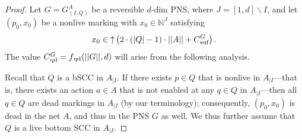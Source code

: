 \documentclass[11pt,a4paper]{amsart}
\newcommand{\nnorm}[1]{||#1||}
\newcommand{\upC}[1]{\mathop{\uparrow}#1}
\newcommand{\suf}{{}_\textnormal{suf}}
\newcommand{\qd}{{}_\textnormal{qd}}
\newcommand{\Nat}{\mathbb{N}}
\newcommand{\restr}[1]{_{|{#1}}}
\newcommand{\setN}{\Nat}
\theoremstyle{plain}
\theoremstyle{definition}
\theoremstyle{defC}
\theoremstyle{thmC}
\begin{document}
\begin{proof}
	Let $G=G^A_{(I,Q)}$ be a reversible $d$-dim PNS, where
	$J=[1,d]\smallsetminus I$, and let $(p_0,x_0)$
be a nonlive marking with $x_0\in\setN^J$ satisfying	
	\begin{equation}\label{eq:xzerobegin}
		x_0\in\upC{\left(2\cdot(|Q|-1)\cdot\nnorm{A}+C\suf^G\right)}.
	\end{equation}
	The value $C\qd^G=f\qd(\nnorm{G},d)$ will arise from the
	following analysis.

Recall that $Q$ is a
	bSCC in $A\restr{I}$.
If there exists $p\in Q$ that is nonlive in $A\restr{I}$---that is, there exists an action
	$a\in A$ that is not enabled at any $q\in Q$ in
	$A\restr{I}$---then all $q\in Q$ are dead markings in
	$A\restr{I}$ (by our terminology);
consequently, $(p_0,x_0)$ is dead in the net $A$, and thus in the PNS $G$ as well.
	We thus further assume that $Q$ is a live bottom SCC in
	$A\restr{I}$.


\end{proof}
\end{document}
